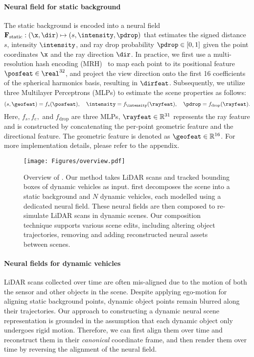 \paragraph{Neural field for static background} 
The static background is encoded into a neural field $\mathbf{F}_\text{static}: (\x, \dir) \mapsto (s, \intensity, \pdrop)$ that estimates the signed distance $s$, intensity $\intensity$, and ray drop probability $\pdrop \in [0,1]$ given the point coordinates $\x$ and the ray direction $\dir$. In practice, we first use a multi-resolution hash encoding (MRH)~\cite{mueller2022instant} to map each point to its positional feature $\posfeat \in \real^{32}$, and project the view direction onto the first 16 coefficients of the spherical harmonics basis, resulting in $\dirfeat$. Subsequently, we utilize three Multilayer Perceptrons (MLPs) to estimate the scene properties as follows:
\begin{equation}
(s, \geofeat) = f_s(\posfeat), \quad \intensity = f_{\intensity}(\rayfeat), \quad \pdrop = f_{\text{drop}}(\rayfeat).
\end{equation}
Here, $f_s, f_e,$ and $f_{\text{drop}}$ are three MLPs, $\rayfeat \in \mathbb{R}^{31}$ represents the ray feature and is constructed by concatenating the per-point geometric feature and the directional feature. The geometric feature is denoted as $\geofeat \in \mathbb{R}^{16}$. For more implementation details, please refer to the appendix. 

\begin{figure}[t]
    \centering
        \texttt{[image: Figures/overview.pdf]}
        \caption{
        Overview of \dynfl. Our method takes LiDAR scans and tracked bounding boxes of dynamic vehicles as input. \dynfl first decomposes the scene into a static background and $N$ dynamic vehicles, each modelled using a dedicated neural field. These neural fields are then composed to re-simulate LiDAR scans in dynamic scenes. Our composition technique supports various scene edits, including altering object trajectories, removing and adding reconstructed neural assets between scenes.
    }
    \label{fig:main}
\end{figure}


\paragraph{Neural fields for dynamic vehicles} 
LiDAR scans collected over time are often mis-aligned due to the motion of both the sensor and other objects in the scene. Despite applying ego-motion for aligning static background points, dynamic object points remain blurred along their trajectories. Our approach to constructing a dynamic neural scene representation is grounded in the assumption that each dynamic object only undergoes rigid motion. Therefore, we can first align them over time and reconstruct them in their \textit{canonical} coordinate frame, and then render them over time by reversing the alignment of the neural field.

